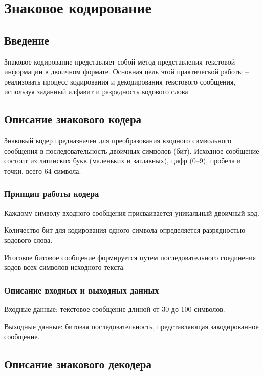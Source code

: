 \chapter{Знаковое кодирование}

\section{Введение}

Знаковое кодирование представляет собой метод представления текстовой информации в двоичном формате. Основная цель этой практической работы – реализовать процесс кодирования и декодирования текстового сообщения, используя заданный алфавит и разрядность кодового слова.

\section{Описание знакового кодера}

Знаковый кодер предназначен для преобразования входного символьного сообщения в последовательность двоичных символов (бит). Исходное сообщение состоит из латинских букв (маленьких и заглавных), цифр (0–9), пробела и точки, всего 64 символа.

\subsection{Принцип работы кодера}

Каждому символу входного сообщения присваивается уникальный двоичный код.

Количество бит для кодирования одного символа определяется разрядностью кодового слова.

Итоговое битовое сообщение формируется путем последовательного соединения кодов всех символов исходного текста.

\subsection{Описание входных и выходных данных}

Входные данные: текстовое сообщение длиной от 30 до 100 символов.

Выходные данные: битовая последовательность, представляющая закодированное сообщение.

\section{Описание знакового декодера}

